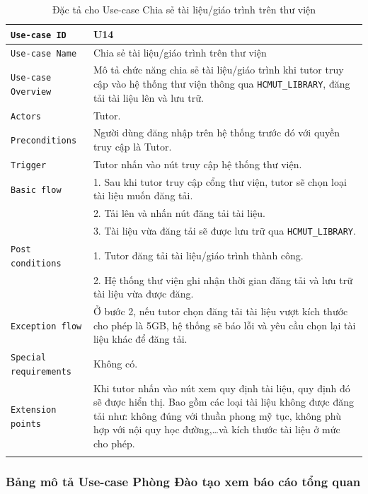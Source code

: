 \begin{longtable}{|p{4.5cm}|p{8cm}|}\hline
	\texttt{Use-case ID} & U14\\
	\hline
	\texttt{Use-case Name} & Chia sẻ tài liệu/giáo trình trên thư viện\\
	\hline
	\texttt{Use-case Overview} & Mô tả chức năng chia sẻ tài liệu/giáo trình khi tutor truy cập vào hệ thống thư viện thông qua \texttt{HCMUT\_LIBRARY}, đăng tải tài liệu lên và lưu trữ.\\
	\hline
	\texttt{Actors} & Tutor.\\
	\hline
	\texttt{Preconditions} &
	Người dùng đăng nhập trên hệ thống trước đó với quyền truy cập là Tutor.
	\\
	\hline
	\texttt{Trigger} & Tutor nhấn vào nút truy cập hệ thống thư viện.\\
	\hline
	\texttt{Basic flow} &
	1. Sau khi tutor truy cập cổng thư viện, tutor sẽ chọn loại tài liệu muốn đăng tải.\\
	&
	2. Tải lên và nhấn nút đăng tải tài liệu.\\
	&
	3. Tài liệu vừa đăng tải sẽ được lưu trữ qua \texttt{HCMUT\_LIBRARY}.
	\\
	\hline
	\texttt{Post conditions} &
	1. Tutor đăng tải tài liệu/giáo trình thành công.\\
	&
	2. Hệ thống thư viện ghi nhận thời gian đăng tải và lưu trữ tài liệu vừa được đăng.
	\\
	\hline
	\texttt{Exception flow} &
	Ở bước 2, nếu tutor chọn đăng tải tài liệu vượt kích thước cho phép là 5GB, hệ thống sẽ báo lỗi và yêu cầu chọn lại tài liệu khác để đăng tải.\\
	\hline
	\texttt{Special requirements} & Không có.\\
	\hline
	\texttt{Extension points} & Khi tutor nhấn vào nút xem quy định tài liệu, quy định đó sẽ được hiển thị. Bao gồm các loại tài liệu không được đăng tải như: không đúng với thuần phong mỹ tục, không phù hợp với nội quy học đường,\ldots và kích thước tài liệu ở mức cho phép.\\
	\hline

	\caption{\label{table2}Đặc tả cho Use-case Chia sẻ tài liệu/giáo trình trên thư viện}
\end{longtable}

\subsubsection{Bảng mô tả Use-case Phòng Đào tạo xem báo cáo tổng quan}

